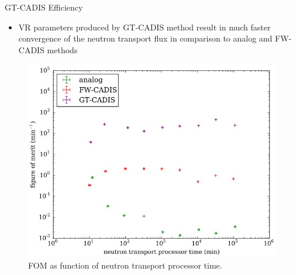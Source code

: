 \documentclass{beamer}
\begin{document}
\begin{frame}{GT-CADIS Efficiency}
	\begin{itemize}
		\item{VR parameters produced by GT-CADIS method result in much
			faster convergence of the neutron transport flux in
			comparison to  analog and FW-CADIS methods}
	\end{itemize}
\begin{figure} 
	\includegraphics[scale=0.35]{gt_fom.jpg}
	\caption {FOM as function of neutron transport processor time.
	\cite{eb_thesis}}
\end{figure}

\end{frame}
\end{document}
